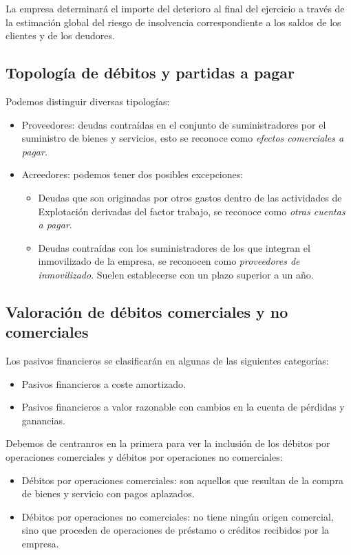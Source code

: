 \documentclass[a4paper,12pt]{article}
\begin{document}
La empresa determinará el importe del deterioro al final del ejercicio a través de la estimación global del riesgo de insolvencia correspondiente a los saldos de los clientes y de los deudores.\\

\subsection{Topología de débitos y partidas a pagar}

Podemos distinguir diversas tipologías:

\begin{itemize}
    \item Proveedores: deudas contraídas en el conjunto de suministradores por el suministro de bienes y servicios, esto se reconoce como \textit{efectos comerciales a pagar}.
    \item Acreedores: podemos tener dos posibles excepciones:
    \begin{itemize}
        \item Deudas que son originadas por otros gastos dentro de las actividades de Explotación derivadas del factor trabajo, se reconoce como \textit{otras cuentas a pagar}.
        \item Deudas contraídas con los suministradores de los que integran el inmovilizado de la empresa, se reconocen como \textit{proveedores de inmovilizado}. Suelen establecerse con un plazo superior a un año.
    \end{itemize}
\end{itemize}

\subsection{Valoración de débitos comerciales y no comerciales}

Los pasivos financieros se clasificarán en algunas de las siguientes categorías:
\begin{itemize}
    \item Pasivos financieros a coste amortizado.
    \item Pasivos financieros a valor razonable con cambios en la cuenta de pérdidas y ganancias.
\end{itemize}


Debemos de centranros en la primera para ver la inclusión de los débitos por operaciones comerciales y débitos por operaciones no comerciales:
\begin{itemize}
    \item Débitos por operaciones comerciales: son aquellos que resultan de la compra de bienes y servicio con pagos aplazados.
    \item Débitos por operaciones no comerciales: no tiene ningún origen comercial, sino que proceden de operaciones de préstamo o créditos recibidos por la empresa.
\end{itemize}
\end{document}
